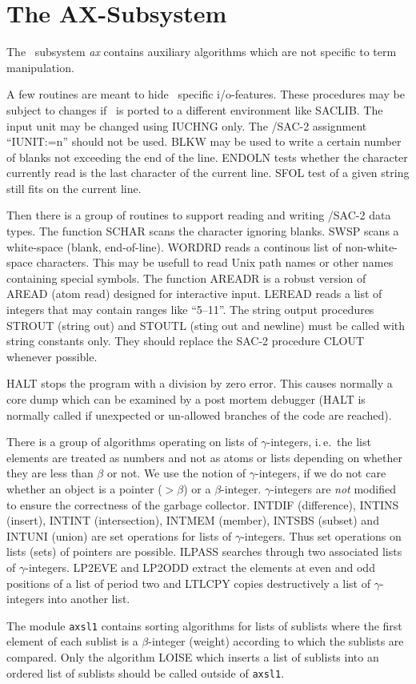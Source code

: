 \section{The AX-Subsystem}

The \redux\ subsystem {\em ax} contains auxiliary algorithms which are not 
specific to term manipulation.

A few routines are meant to hide \ALDES\ specific i/o-features.
These procedures may be subject to changes if \redux\ is ported to
a different environment like SACLIB.
The input unit may be changed using IUCHNG only.
The \ALDES/SAC-2 assignment ``IUNIT:=n'' should not be used.
BLKW may be used to write a certain number of blanks not exceeding the 
end of the line.
ENDOLN tests whether the character currently read is the last character of
the current line.
SFOL test of a given string still fits on the current line.

Then there is a group of routines to support reading and writing
\ALDES/SAC-2 data types.
The function SCHAR scans the character ignoring blanks.
SWSP scans a white-space (blank, end-of-line).
WORDRD reads a continous list of non-white-space characters.
This may be usefull to read Unix path names or other names containing special 
symbols.
The function AREADR is a robust version of AREAD (atom read) designed for
interactive input.
LEREAD reads a list of integers that may contain ranges like ``5--11''.
The string output procedures STROUT (string out) and 
STOUTL (sting out and newline) must be called with string
constants only.
They should replace the SAC-2 procedure CLOUT whenever possible.

HALT stops the program with a division by zero error.
This causes normally a core dump which can be examined by a post mortem
debugger 
(HALT is normally called if unexpected or un-allowed branches of the code
are reached).

There is a group of algorithms operating on lists of $\gamma$-integers,
i.\,e.\ the list elements are treated as numbers and not as atoms or lists
depending on whether they are less than $\beta$ or not.
We use the notion of $\gamma$-integers, if we do not care whether an object
is a pointer ($ > \beta$) or a $\beta$-integer.
$\gamma$-integers are {\em not} modified to ensure the correctness of the
garbage collector.
INTDIF (difference), INTINS (insert), INTINT (intersection), 
INTMEM (member), INTSBS (subset) and INTUNI (union) are set operations for 
lists of $\gamma$-integers.
Thus set operations on lists (sets) of pointers are possible.
ILPASS searches through two associated lists of $\gamma$-integers.
LP2EVE and LP2ODD extract the elements at even and odd positions
of a list of period two
and LTLCPY copies destructively a list of $\gamma$-integers into another list.

The module {\tt axsl1} contains sorting algorithms for lists of 
sublists where the first element of each sublist is a $\beta$-integer
(weight) according to which the sublists are compared.
Only the algorithm LOISE which inserts a list of sublists into an
ordered list of sublists should be called outside of {\tt axsl1}.
